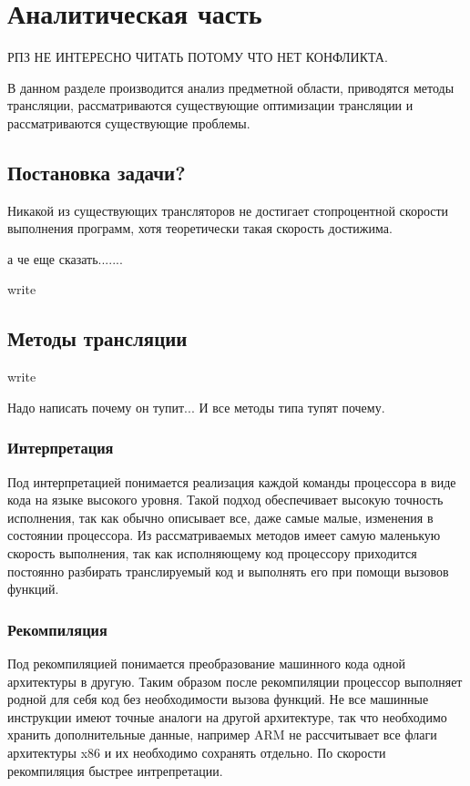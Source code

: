 \section{Аналитическая часть}
 
РПЗ НЕ ИНТЕРЕСНО ЧИТАТЬ ПОТОМУ ЧТО НЕТ КОНФЛИКТА.
 
В данном разделе производится анализ предметной области, приводятся методы трансляции, рассматриваются существующие оптимизации трансляции и рассматриваются существующие проблемы.
 
\subsection{Постановка задачи?}
 
Никакой из существующих трансляторов не достигает стопроцентной скорости выполнения программ, хотя теоретически такая скорость достижима.
 
а че еще сказать.......

write

\subsection{Методы трансляции}

write

Надо написать почему он тупит... И все методы типа тупят почему.

\subsubsection{Интерпретация}

Под интерпретацией понимается реализация каждой команды процессора в виде кода на языке высокого уровня. Такой подход обеспечивает высокую точность исполнения, так как обычно описывает все, даже самые малые, изменения в состоянии процессора. Из рассматриваемых методов имеет самую маленькую скорость выполнения, так как исполняющему код процессору приходится постоянно разбирать транслируемый код и выполнять его при помощи вызовов функций.

\subsubsection{Рекомпиляция}

Под рекомпиляцией понимается преобразование машинного кода одной архитектуры в другую. Таким образом после рекомпиляции процессор выполняет родной для себя код без необходимости вызова функций. Не все машинные инструкции имеют точные аналоги на другой архитектуре, так что необходимо хранить дополнительные данные, например ARM не рассчитывает все флаги архитектуры x86 и их необходимо сохранять отдельно. По скорости рекомпиляция быстрее интрепретации.

